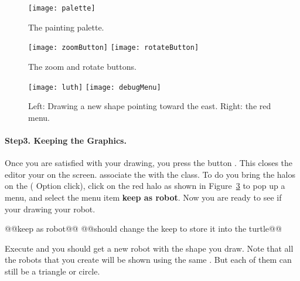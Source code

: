 \begin{figure}
\begin{center}
\texttt{[image: palette]}
\end{center}
\caption{The painting  palette. \label{fig:palette}}
\end{figure}

\begin{figure}
\begin{center}
\texttt{[image: zoomButton]} \texttt{[image: rotateButton]}
\end{center}
\caption{The zoom and rotate buttons. \label{fig:zoom}\label{fig:rotate}}
\end{figure}


\begin{figure}
\begin{center}
\texttt{[image: luth]} \texttt{[image: debugMenu]}
\end{center}
\caption{Left: Drawing a new shape pointing toward the east. \label{fig:luth} Right:  the red  menu. \label{fig:redMenu}}
\end{figure}

\paragraph{Step3. Keeping the Graphics.} Once you are satisfied with your drawing, you  press the button . This closes the editor  your  on the screen.  associate the  with the \ct{\Turtle} class. To do  you  bring  the halos on the  ( Option  click), click on the red halo as shown in Figure~\ref{fig:redMenu} to pop up a menu, and select the menu item \textbf{keep as robot}.\add{\paragraph
} 
Now you are ready to see if your drawing 
 your robot. 

@@keep as robot@@
@@should change the keep to store it into the turtle@@

Execute  and you should get a new robot with the shape you draw. Note that all the  robots that you  create will be shown using the same . But each of them can still be  a triangle or circle.


